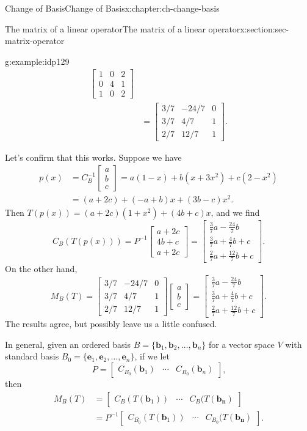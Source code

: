 \documentclass[oneside,10pt,]{book}
\numberwithin{equation}{section}
\newcommand{\bbm}{\begin{bmatrix}}
\newcommand{\ebm}{\end{bmatrix}}
\newcommand{\basis}[2]{\{\mathbf{#1}_1,\mathbf{#1}_2,\ldots,\mathbf{#1}_{#2}\}}
\newcommand{\amp}{&}
\begin{document}
\begin{chapterptx}{Change of Basis}{}{Change of Basis}{}{}{x:chapter:ch-change-basis}
\begin{sectionptx}{The matrix of a linear operator}{}{The matrix of a linear operator}{}{}{x:section:sec-matrix-operator}
\begin{example}{}{g:example:idp129}
\begin{align*}
\bbm 1\amp 0\amp 2\\0\amp 4\amp 1\\1\amp 0\amp 2\ebm\\
\amp = \bbm 3/7\amp -24/7\amp 0\\3/7\amp 4/7\amp 1\\2/7\amp 12/7\amp 1\ebm\text{.}
\end{align*}
%
\par
Let's confirm that this works. Suppose we have%
\begin{align*}
p(x) \amp = C_B^{-1}\bbm a\\b\\c\ebm = a(1-x)+b(x+3x^2)+c(2-x^2)\\
\amp = (a+2c)+(-a+b)x+(3b-c)x^2\text{.}
\end{align*}
Then \(T(p(x))=(a+2c)(1+x^2)+(4b+c)x\), and we find%
\begin{equation*}
C_B(T(p(x))) = P^{-1}\bbm a+2c\\4b+c\\a+2c\ebm = \bbm \frac37 a-\frac{24}{7}b\\\frac37 a+\frac47 b+c\\\frac27 a+\frac{12}{7}b+c\ebm\text{.}
\end{equation*}
On the other hand,%
\begin{equation*}
M_B(T) = \bbm 3/7\amp -24/7\amp 0\\3/7\amp 4/7\amp 1\\2/7\amp 12/7\amp 1\ebm\bbm a\\b\\c\ebm = \bbm \frac37 a-\frac{24}{7}b\\\frac37 a+\frac47 b+c\\\frac27 a+\frac{12}{7}b+c\ebm\text{.}
\end{equation*}
The results agree, but possibly leave us a little confused.%
\end{example}
In general, given an ordered basis \(B=\basis{b}{n}\) for a vector space \(V\) with standard basis \(B_0 = \basis{e}{n}\), if we let%
\begin{equation*}
P = \bbm C_{B_0}(\mathbf{b}_1) \amp \cdots \amp C_{B_0}(\mathbf{b}_n)\ebm\text{,}
\end{equation*}
then%
\begin{align*}
M_B(T) \amp = \bbm C_B(T(\mathbf{b}_1)) \amp \cdots \amp C_B(T(\mathbf{b_n})\ebm\\
\amp = P^{-1}\bbm C_{B_0}(T(\mathbf{b}_1)) \amp \cdots \amp C_{B_0}(T(\mathbf{b_n})\ebm\text{.}
\end{align*}

\end{sectionptx}
\end{chapterptx}
\end{document}
